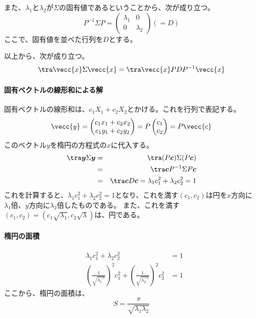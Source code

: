 また、$\lambda_1$と$\lambda_2$が$\Sigma$の固有値であるということから、次が成り立つ。
\begin{equation*}
 P^{-1}\Sigma P = \begin{pmatrix}
                 \lambda_1 & 0\\
                 0 & \lambda_2
                \end{pmatrix}(=D)
\end{equation*}
ここで、固有値を並べた行列を$D$とする。

以上から、次が成り立つ。
\begin{eqnarray*}
 \tra \vecc{x}\Sigma\vecc{x} = \tra \vecc{x}PDP^{-1}\vecc{x}
\end{eqnarray*}

\paragraph{固有ベクトルの線形和による解}
固有ベクトルの線形和は、$c_1X_1+c_2X_2$とかける。これを行列で表記する。
\begin{equation*}
 \vecc{y} = \begin{pmatrix}
      c_1 x_1+ c_2 x_2\\
      c_1y_1+c_2y_2
     \end{pmatrix}
     = P\begin{pmatrix}
         c_1\\
         c_2
        \end{pmatrix}=P\vecc{c}
\end{equation*}
このベクトル$y$を楕円の方程式の$x$に代入する。
\begin{eqnarray*}
 \tra \bm{y} \Sigma \bm{y} &=& \tra(P\bm{c})\Sigma(P\bm{c}) \\
 &=& \tra \bm{c}P^{-1} \Sigma P \bm{c} \\
 &=& \tra\bm{c} D \bm{c} = \lambda_1c_1^2+\lambda_2c_2^2 = 1
\end{eqnarray*}
これを計算すると、$\lambda_1c_1^2+\lambda_2c_2^2=1$となり、これを満す$(c_1,c_2)$は円を$x$方向に$\lambda_1$倍、$y$方向に$\lambda_2$倍したものである。
また、これを満す$(c_1,c_2)=(c_1\sqrt{\lambda_1},c_2\sqrt{\lambda})$は、円である。

\paragraph{楕円の面積}

\begin{eqnarray*}
 &\lambda_1c_1^2+\lambda_2c_2^2 &= 1 \\
 &\left(\frac{1}{\sqrt{\lambda_1^{-1}}}\right)^2c_1^2+\left(\frac{1}{\sqrt{\lambda_2^{-1}}}\right)^2c_2^2&=1
\end{eqnarray*}
ここから、楕円の面積は、
\begin{equation*}
 S = \frac{\pi}{\sqrt{\lambda_1\lambda_2}}
\end{equation*}


